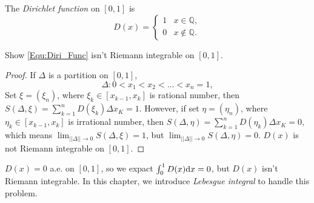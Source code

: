 \begin{defn}
    The \textit{Dirichlet function }on $[0,1]$ is 
    \begin{equation}
        \label{Equ:Diri_Func}
        D(x)=\left\{
            \begin{array}{rl}
                1&x\in \mathbb{Q},\\
                0&x\notin\mathbb{Q}.
            \end{array}
        \right.
    \end{equation}
\end{defn}
\begin{exc}
    Show \eqref{Equ:Diri_Func} isn't Riemann integrable on $[0,1]$.
\end{exc}
\begin{proof}
    If $\Delta$ is a partition on $[0,1]$,
    \begin{displaymath}
        \Delta:0<x_1<x_2<\ldots<x_n=1,
    \end{displaymath}
    Set $\xi=(\xi_n)$, where $\xi_k\in[x_{k-1},x_k]$ is rational number,
    then $S(\Delta,\xi)=\sum_{k=1}^{n}D(\xi_k)\Delta x_K=1$.
    However, if set $\eta=(\eta_n)$, where $\eta_k\in[x_{k-1},x_k]$
    is irrational number, 
    then $S(\Delta,\eta)=\sum_{k=1}^{n}D(\eta_k)\Delta x_K=0$, 
    which means $\lim_{||\Delta||\rightarrow 0}S(\Delta,\xi)=1$,
    but $\lim_{||\Delta||\rightarrow 0}S(\Delta,\eta)=0$. 
    $D(x)$ is not Riemann integrable on $[0,1]$.
\end{proof}
\begin{rem}
    $D(x)=0$ a.e. on $[0,1]$, so we expact $\int_{0}^{1}D(x)\mathrm{d} x=0$, 
    but $D(x)$ isn't Riemann integrable. 
    In this chapter, we introduce \textit{Lebesgue integral} to 
    handle this problem.
\end{rem}
